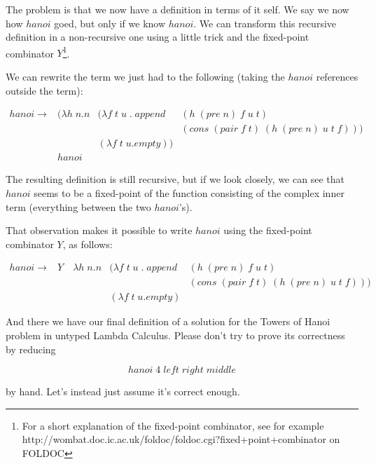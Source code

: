 \documentclass[11pt]{article}
\begin{document}
The problem is that we now have a definition in terms of it self. We say we now how $hanoi$ goed, but only if we know $hanoi$. We can transform this recursive definition in a non-recursive one using a little trick and the fixed-point combinator $Y$\footnote{For a short explanation of the fixed-point combinator, see for example http://wombat.doc.ic.ac.uk/foldoc/foldoc.cgi?fixed+point+combinator on FOLDOC}.

We can rewrite the term we just had to the following (taking the $hanoi$ references outside the term):

\begin{displaymath}
\begin{array}{llll}
hanoi \to & (\lambda h \; n.n & ( \lambda f \; t \; u\;. \; append & (h\;(pre\;n)\;f\;u\;t) \\
& & & (cons \; (pair\;f\;t) \; (h\;(pre\;n)\;u\;t\;f)) ) \\
& & (\lambda f \; t \; u.empty)) & \\
& hanoi & &
\end{array}
\end{displaymath}

The resulting definition is still recursive, but if we look closely, we can see that $hanoi$ seems to be a fixed-point of the function consisting of the complex inner term (everything between the two $hanoi$'s).

That observation makes it possible to write $hanoi$ using the fixed-point combinator $Y$, as follows:

\begin{displaymath}
\begin{array}{llll}
hanoi \to & Y \quad \lambda h \; n.n & ( \lambda f \; t \; u\;. \; append & (h\;(pre\;n)\;f\;u\;t) \\
& & & (cons \; (pair\;f\;t) \; (h\;(pre\;n)\;u\;t\;f)) ) \\
& & (\lambda f \; t \; u.empty) &
\end{array}
\end{displaymath}

And there we have our final definition of a solution for the Towers of Hanoi problem in untyped Lambda Calculus. Please don't try to prove its correctness by reducing

\begin{displaymath}
hanoi \; 4 \; left \; right \; middle
\end{displaymath}

by hand. Let's instead just assume it's correct enough.
\end{document}

